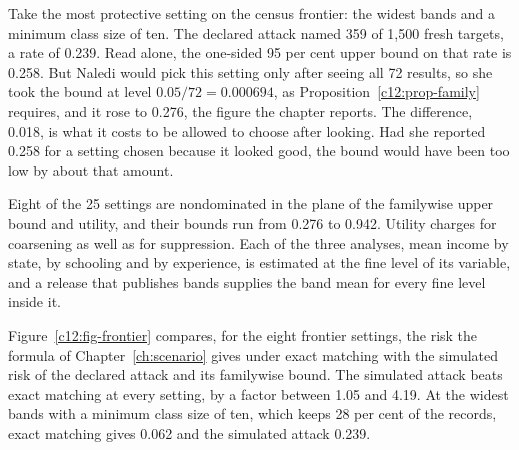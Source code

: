 \begin{example}\label{c12:ex-setting}
Take the most protective setting on the census frontier: the widest bands and a minimum
class size of ten. The declared attack named 359 of 1,500 fresh targets, a rate of 0.239.
Read alone, the one-sided 95 per cent upper bound on that rate is 0.258. But Naledi would
pick this setting only after seeing all 72 results, so she took the bound at level
$0.05/72 = 0.000694$, as Proposition~\ref{c12:prop-family} requires, and it rose to
0.276, the figure the chapter reports. The difference, 0.018, is what it costs to be
allowed to choose after looking. Had she reported 0.258 for a setting chosen because it
looked good, the bound would have been too low by about that amount.
\end{example}

Eight of the 25 settings are nondominated in the plane of the familywise upper bound
and utility, and their bounds run from 0.276 to 0.942.
Utility charges for coarsening as well as for suppression. Each of the three analyses,
mean income by state, by schooling and by experience, is estimated at the fine level
of its variable, and a release that publishes bands supplies the band mean for every
fine level inside it.

Figure~\ref{c12:fig-frontier} compares, for the eight frontier settings, the risk the
formula of Chapter~\ref{ch:scenario} gives under exact matching with the simulated
risk of the declared attack and its familywise bound. The simulated attack beats exact
matching at every setting, by a factor between 1.05 and 4.19. At the widest bands with a
minimum class size of ten, which keeps 28 per cent of the records, exact matching gives
0.062 and the simulated attack 0.239.

